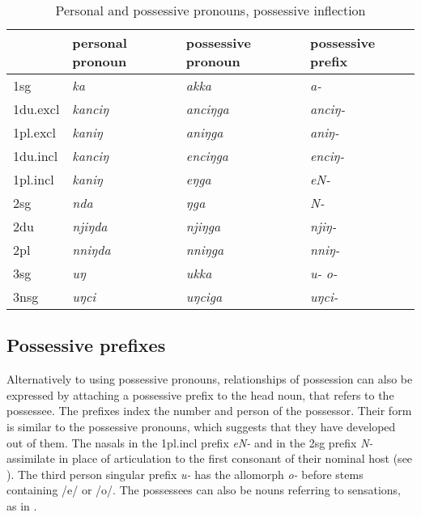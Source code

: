 \begin{table}
{\small
\begin{centering}
\begin{tabular}{llll}
\toprule
				&{\sc personal pronoun}		&{\sc possessive pronoun}&		{\sc possessive	prefix}\\
\midrule
{\sc 1sg}		&\emph{ka}			&	\emph{akka }	&	\emph{a-}\\
{\sc 1du.excl}&	\emph{kanciŋ}		&	\emph{anciŋga} &	\emph{anciŋ-}\\
{\sc 1pl.excl}&	\emph{kaniŋ}		&	\emph{aniŋga} &	\emph{aniŋ-}\\
{\sc 1du.incl}&	\emph{kanciŋ}		&	\emph{enciŋga} &	\emph{enciŋ-}\\
{\sc 1pl.incl}&	\emph{kaniŋ}		&	\emph{eŋga} &		\emph{eN-}\\
\midrule
{\sc 2sg}&	\emph{nda} 			&	\emph{ŋga} &		\emph{N-}	\\
{\sc 2du}&	\emph{njiŋda}			&	\emph{njiŋga} &	\emph{njiŋ-}\\
{\sc 2pl}&	\emph{nniŋda}			&	\emph{nniŋga} 	&	\emph{nniŋ-}\\
\midrule
{\sc 3sg}&	\emph{uŋ}				&	\emph{ukka} 	&	\emph{u-} \ti \emph{o-}\\	
{\sc 3nsg}&	\emph{uŋci}			&	\emph{uŋciga} &	\emph{uŋci-}\\
\bottomrule
\end{tabular}
\caption{Personal and possessive pronouns, possessive inflection}\label{poss}
\end{centering}
}
\end{table}


\subsection{Possessive prefixes}

Alternatively to using possessive pronouns, relationships of possession can also be expressed by attaching a possessive prefix to the head noun, that refers to the possessee. The prefixes index the number and person of the possessor. Their form is similar to the possessive pronouns, which suggests that they have developed out of them. The nasals in the {\sc 1pl.incl} prefix \emph{eN-} and in the {\sc 2sg} prefix \emph{N-} assimilate in place of articulation to the first consonant of their nominal host (see \Next). The third person singular prefix \emph{u-} has the allomorph \emph{o-} before stems containing /e/ or /o/. The possessees can also be nouns referring to sensations, as in \Next[a]. 


